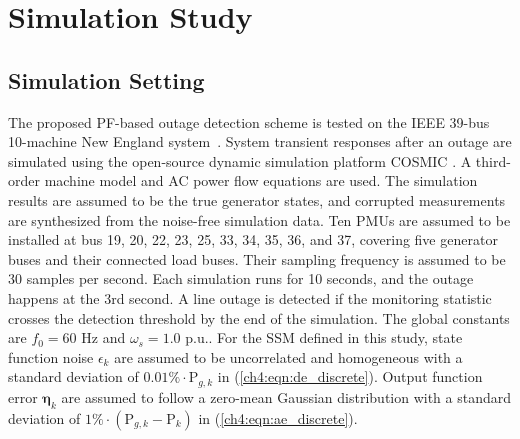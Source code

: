 \section{Simulation Study}
\label{ch4:sec:results}
\subsection{Simulation Setting}
The proposed PF-based outage detection scheme is tested on the IEEE 39-bus 10-machine New England system~\cite{athay1979practical}. System transient responses after an outage are simulated using the open-source dynamic simulation platform COSMIC \cite{Song2016}. A third-order machine model and AC power flow equations are used. The simulation results are assumed to be the true generator states, and corrupted measurements are synthesized from the noise-free simulation data. Ten PMUs are assumed to be installed at bus 19, 20, 22, 23, 25, 33, 34, 35, 36, and 37, covering five generator buses and their connected load buses. Their sampling frequency is assumed to be 30 samples per second. Each simulation runs for 10 seconds, and the outage happens at the 3rd second. A line outage is detected if the monitoring statistic crosses the detection threshold by the end of the simulation. The global constants are $f_0 = 60 $ Hz and $\omega_s = 1.0 $ p.u.. For the SSM defined in this study, state function noise $\epsilon_k$ are assumed to be uncorrelated and homogeneous with a standard deviation of $0.01\% \cdot \text{P}_{g,k}$ in (\ref{ch4:eqn:de_discrete}). Output function error $\boldsymbol{\eta}_k$ are assumed to follow a zero-mean Gaussian distribution with a standard deviation of 
$1\% \cdot (\text{P}_{g, k}- \text{P}_{k})$ in (\ref{ch4:eqn:ae_discrete}). 


